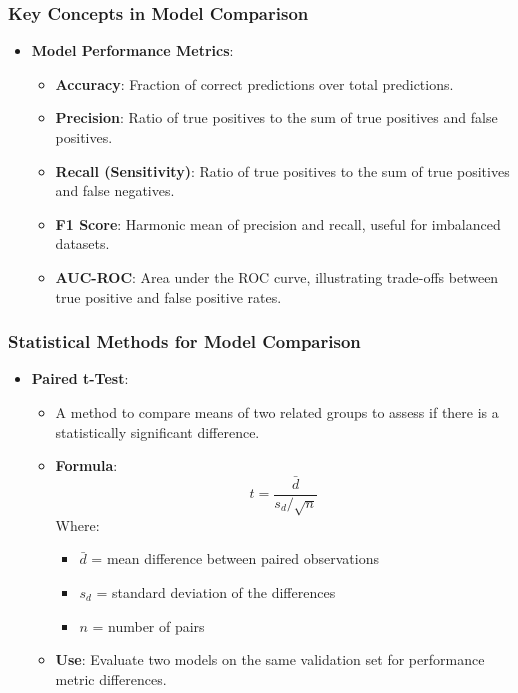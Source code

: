 \documentclass[aspectratio=169]{beamer}
\begin{document}
\begin{frame}
    \frametitle{Key Concepts in Model Comparison}
    \begin{itemize}
        \item \textbf{Model Performance Metrics}:
        \begin{itemize}
            \item \textbf{Accuracy}: Fraction of correct predictions over total predictions.
            \item \textbf{Precision}: Ratio of true positives to the sum of true positives and false positives.
            \item \textbf{Recall (Sensitivity)}: Ratio of true positives to the sum of true positives and false negatives.
            \item \textbf{F1 Score}: Harmonic mean of precision and recall, useful for imbalanced datasets.
            \item \textbf{AUC-ROC}: Area under the ROC curve, illustrating trade-offs between true positive and false positive rates.
        \end{itemize}
    \end{itemize}
\end{frame}

\begin{frame}
    \frametitle{Statistical Methods for Model Comparison}
    \begin{itemize}
        \item \textbf{Paired t-Test}:
        \begin{itemize}
            \item A method to compare means of two related groups to assess if there is a statistically significant difference.
            \item \textbf{Formula}:
            \begin{equation}
            t = \frac{\bar{d}}{s_d / \sqrt{n}}
            \end{equation}
            Where:
            \begin{itemize}
                \item \( \bar{d} \) = mean difference between paired observations
                \item \( s_d \) = standard deviation of the differences
                \item \( n \) = number of pairs
            \end{itemize}
            \item \textbf{Use}: Evaluate two models on the same validation set for performance metric differences.
        \end{itemize}
    \end{itemize}
\end{frame}
\end{document}
